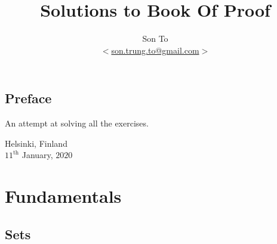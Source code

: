 \documentclass[a4paper,11pt]{memoir}
\title{Solutions to Book Of Proof}
\author{Son To\\
$<$\href{mailto:son.trung.to@gmail.com}{son.trung.to@gmail.com}$>$}
\affil{Fazer Oy, Arcada Ammattikorkeakoulu}
\theoremstyle{plain}        \newtheorem{id}{Lemma}[chapter]
\theoremstyle{definition}   \newtheorem{ex}{Exercise}[section]
\theoremstyle{remark}       \newtheorem{ab}{Conjecture}[section]
\begin{document}
  \maketitle
  \thispagestyle{empty}

  \frontmatter
   \chapter{Preface}
     An attempt at solving all the exercises.
     \begin{flushright}
       Helsinki, Finland \\$11^{\text{th}}$ January, $2020$
     \end{flushright}
   \clearpage
   \tableofcontents

   \mainmatter
   \part{Fundamentals}
   \chapter{Sets}
      
\end{document}
